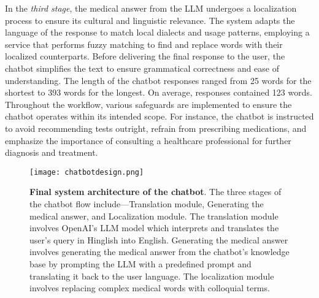 In the \textit{third stage}, the medical answer from the LLM undergoes a localization process to ensure its cultural and linguistic relevance. The system adapts the language of the response to match local dialects and usage patterns, employing a service that performs fuzzy matching to find and replace words with their localized counterparts. Before delivering the final response to the user, the chatbot simplifies the text to ensure grammatical correctness and ease of understanding. 
The length of the chatbot responses ranged from 25 words for the shortest to 393 words for the longest. On average, responses contained 123 words. Throughout the workflow, various safeguards are implemented to ensure the chatbot operates within its intended scope. For instance, the chatbot is instructed to avoid recommending tests outright, refrain from prescribing medications, and emphasize the importance of consulting a healthcare professional for further diagnosis and treatment. 
\begin{figure*}[h]
  \centering
  \texttt{[image: chatbotdesign.png]} 
  \caption{\textbf{Final system architecture of the chatbot}. The three stages of the chatbot flow include---Translation module, Generating the medical answer, and Localization module. The translation module involves OpenAI’s LLM model which interprets and translates the user’s query in Hinglish into English. Generating the medical answer involves generating the medical answer from the chatbot’s knowledge base by prompting the LLM with a predefined prompt and translating it back to the user language. The localization module involves replacing complex medical words with colloquial terms.
}
  \label{fig:design1}
\end{figure*}